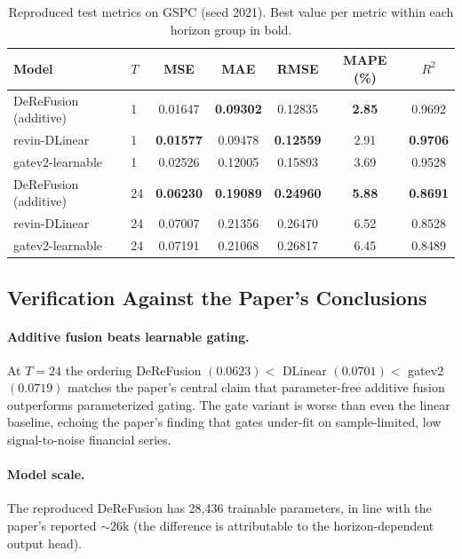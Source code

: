 \documentclass[conference]{IEEEtran}
\begin{document}
\begin{table}[!t]
\centering
\caption{Reproduced test metrics on GSPC (seed 2021). Best value per metric
within each horizon group in bold.}
\label{tab:main}
\small
\begin{tabular}{llccccc}
\toprule
Model & $T$ & MSE & MAE & RMSE & MAPE (\%) & $R^2$ \\
\midrule
DeReFusion (additive) & 1  & 0.01647 & \textbf{0.09302} & 0.12835 & \textbf{2.85} & 0.9692 \\
revin-DLinear         & 1  & \textbf{0.01577} & 0.09478 & \textbf{0.12559} & 2.91 & \textbf{0.9706} \\
gatev2-learnable      & 1  & 0.02526 & 0.12005 & 0.15893 & 3.69 & 0.9528 \\
\midrule
DeReFusion (additive) & 24 & \textbf{0.06230} & \textbf{0.19089} & \textbf{0.24960} & \textbf{5.88} & \textbf{0.8691} \\
revin-DLinear         & 24 & 0.07007 & 0.21356 & 0.26470 & 6.52 & 0.8528 \\
gatev2-learnable      & 24 & 0.07191 & 0.21068 & 0.26817 & 6.45 & 0.8489 \\
\bottomrule
\end{tabular}
\end{table}

\subsection{Verification Against the Paper's Conclusions}

\paragraph{Additive fusion beats learnable gating.} At $T=24$ the ordering
DeReFusion $(0.0623) <$ DLinear $(0.0701) <$ gatev2 $(0.0719)$ matches the
paper's central claim that parameter-free additive fusion outperforms
parameterized gating. The gate variant is worse than even the linear
baseline, echoing the paper's finding that gates under-fit on
sample-limited, low signal-to-noise financial series.

\paragraph{Model scale.} The reproduced DeReFusion has 28,436 trainable
parameters, in line with the paper's reported ${\sim}26$k (the difference
is attributable to the horizon-dependent output head).
\end{document}
